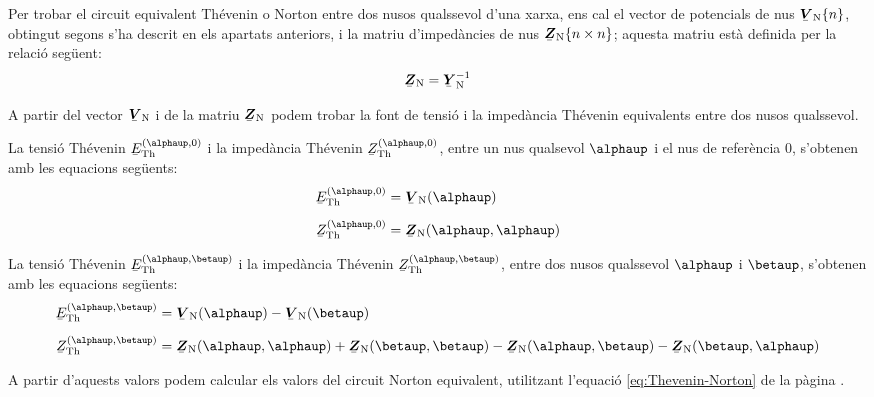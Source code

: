 Per trobar el
circuit equivalent Thévenin o Norton entre dos nusos qualssevol
d'una xarxa, ens cal el vector de potencials de nus
$\mcmplx{V}\ped{N}\{n\}$, obtingut segons s'ha descrit en els
apartats anteriors, i la matriu d'impedàncies de nus
$\mcmplx{Z}\ped{N}\{n\times n\}$; aquesta matriu està definida per
la relació següent:
\begin{equation}
   \mcmplx{Z}\ped{N} = \mcmplx{Y}\ped{N}^{-1}
\end{equation}

A partir del vector $\mcmplx{V}\ped{N}$ i de la matriu
$\mcmplx{Z}\ped{N}$ podem trobar la font de tensió i la impedància
Thévenin equivalents entre dos nusos qualssevol.

La tensió Thévenin $\cmplx{E}\ped{Th}^{(\alphaup,0)}$ i la impedància
Thévenin $\cmplx{Z}\ped{Th}^{(\alphaup,0)}$, entre  un nus qualsevol
$\alphaup$ i el nus de referència 0, s'obtenen amb les equacions
següents:
\begin{align}
    \cmplx{E}\ped{Th}^{(\alphaup,0)} &= \mcmplx{V}\ped{N}(\alphaup) \\[2mm]
    \cmplx{Z}\ped{Th}^{(\alphaup,0)} &= \mcmplx{Z}\ped{N}(\alphaup,\alphaup)
\end{align}

La tensió Thévenin $\cmplx{E}\ped{Th}^{(\alphaup,\betaup)}$ i la
impedància Thévenin $\cmplx{Z}\ped{Th}^{(\alphaup,\betaup)}$, entre dos
nusos qualssevol $\alphaup$ i $\betaup$, s'obtenen amb les equacions
següents:
\begin{align}
    \cmplx{E}\ped{Th}^{(\alphaup,\betaup)} &= \mcmplx{V}\ped{N}(\alphaup) - \mcmplx{V}\ped{N}(\betaup) \\[2mm]
    \cmplx{Z}\ped{Th}^{(\alphaup,\betaup)} &= \mcmplx{Z}\ped{N}(\alphaup,\alphaup) +
    \mcmplx{Z}\ped{N}(\betaup,\betaup) - \mcmplx{Z}\ped{N}(\alphaup,\betaup) -
    \mcmplx{Z}\ped{N}(\betaup,\alphaup)
\end{align}

A partir d'aquests valors podem calcular els valors del circuit Norton equivalent, utilitzant l'equació \eqref{eq:Thevenin-Norton} de la pàgina \pageref{eq:Thevenin-Norton}.


